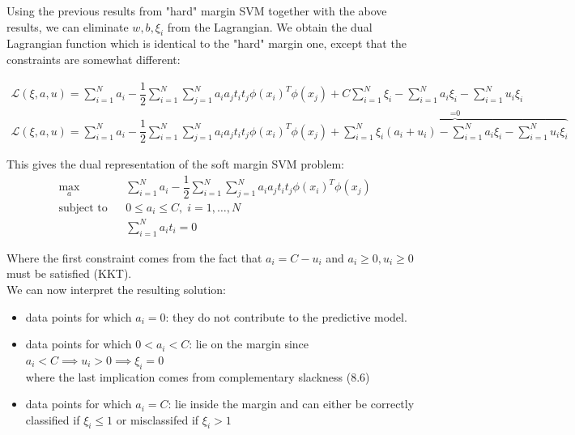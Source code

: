 \documentclass[twoside]{article}
\begin{document}
Using the previous results from "hard" margin SVM together with the above  results, we can  eliminate $w,b,\xi_{i}$ from the Lagrangian. We obtain the dual Lagrangian function which is identical to the "hard" margin one, except that the constraints are somewhat different:


\begin{align*}
         \mathcal{L}(\xi,a,u) = \sum_{i=1}^{N} a_{i}  - \dfrac{1}{2}
    \sum_{i=1}^{N} { \sum_{j=1}^{N} a_{i} a_{j} t_{i} t_{j} \phi(x_{i})^T \phi(x_{j})} + C \sum_{i=1}^{N} \xi_{i} - \sum_{i=1}^{N} a_{i} \xi_{i} -
         \sum_{i=1}^{N} u_{i} \xi_{i} \\       
          \mathcal{L}(\xi,a,u) = \sum_{i=1}^{N} a_{i}  - \dfrac{1}{2}
    \sum_{i=1}^{N} { \sum_{j=1}^{N} a_{i} a_{j} t_{i} t_{j} \phi(x_{i})^T \phi(x_{j})} +  \overbrace{\sum_{i=1}^{N} \xi_{i} (a_{i} + u_{i}) - \sum_{i=1}^{N} a_{i} \xi_{i} -
         \sum_{i=1}^{N} u_{i} \xi_{i}}^\text{=0} 
        \end{align*}

This gives the dual representation of the soft margin SVM problem:
\begin{equation*}
\begin{aligned}
& \underset{a}{\text{max}}
& & \sum_{i=1}^{N} a_{i}  - \dfrac{1}{2}
    \sum_{i=1}^{N} { \sum_{j=1}^{N} a_{i} a_{j} t_{i} t_{j} \phi(x_{i})^T \phi(x_{j})}\\
& \text{subject to}
& & 0 \leq a_{i} \leq C  , \; i = 1, \ldots, N \\
&&& \sum_{i=1}^{N} a_{i}t_{i} = 0
\end{aligned}
\end{equation*}

Where the first constraint comes from the fact that $a_{i} = C - u_{i}$ and $a_{i} \geq 0, u_{i} \geq 0$ must be satisfied (KKT).
\\

We can now interpret the resulting solution:
\begin{itemize}
    \item data points for which $a_{i} = 0$: they do not contribute to the predictive model.
    \item data points for which $0 < a_{i} < C$: lie on the margin since $a_{i} < C \implies u_{i} > 0 \implies \xi_{i} = 0$  \\ where the last implication comes from complementary slackness (8.6)
    \item data points for which $a_{i} = C$: lie inside the margin and can either be correctly classified if $\xi_{i} \leq 1$ or misclassifed if $\xi_{i} > 1$
\end{itemize}
\newpage
\end{document}
